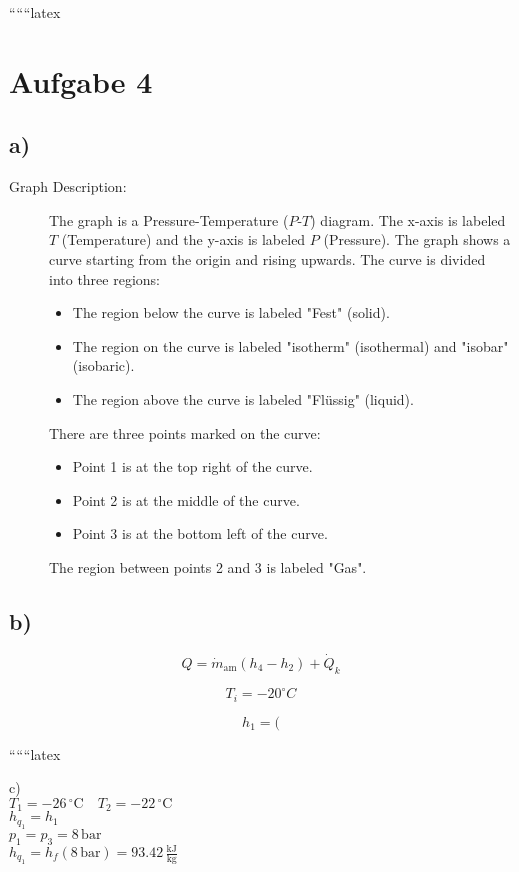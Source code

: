
``````latex


\section*{Aufgabe 4}

\subsection*{a)}

\begin{description}
    \item[Graph Description:] The graph is a Pressure-Temperature ($P$-$T$) diagram. The x-axis is labeled $T$ (Temperature) and the y-axis is labeled $P$ (Pressure). The graph shows a curve starting from the origin and rising upwards. The curve is divided into three regions:
    \begin{itemize}
        \item The region below the curve is labeled "Fest" (solid).
        \item The region on the curve is labeled "isotherm" (isothermal) and "isobar" (isobaric).
        \item The region above the curve is labeled "Flüssig" (liquid).
    \end{itemize}
    There are three points marked on the curve:
    \begin{itemize}
        \item Point 1 is at the top right of the curve.
        \item Point 2 is at the middle of the curve.
        \item Point 3 is at the bottom left of the curve.
    \end{itemize}
    The region between points 2 and 3 is labeled "Gas".
\end{description}

\subsection*{b)}

\[
Q = \dot{m}_{\text{am}} (h_4 - h_2) + \dot{Q}_k
\]

\[
T_i = -20^\circ C
\]

\[
h_1 = (
\]

``````latex

c) \\
$T_1 = -26 \, ^\circ \text{C} \quad T_2 = -22 \, ^\circ \text{C}$ \\
$h_{q_1} = h_1$ \\
$p_1 = p_3 = 8 \, \text{bar}$ \\
$h_{q_1} = h_f (8 \, \text{bar}) = 93.42 \, \frac{\text{kJ}}{\text{kg}}$ \\

